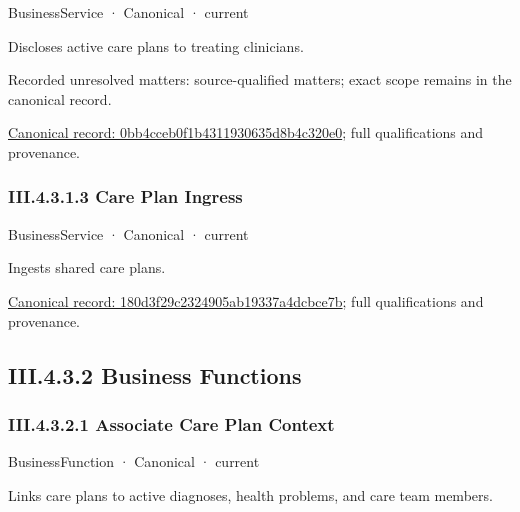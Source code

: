 \label{element:0bb4cceb0f1b4311930635d8b4c320e0}
{\small BusinessService · Canonical · current}\par

Discloses active care plans to treating clinicians.


{\small Recorded unresolved matters: source-qualified matters; exact scope remains in the canonical record.}\par
{\footnotesize \href{../../../../continuum/business/business-service/0bb4cceb0f1b4311930635d8b4c320e0.md}{Canonical record: 0bb4cceb0f1b4311930635d8b4c320e0}; full qualifications and provenance.}\par
\subsubsection*{III.4.3.1.3 Care Plan Ingress}
\label{navigation:III.4.3.1.3}

\label{element:180d3f29c2324905ab19337a4dcbce7b}
{\small BusinessService · Canonical · current}\par

Ingests shared care plans.


{\footnotesize \href{../../../../continuum/business/business-service/180d3f29c2324905ab19337a4dcbce7b.md}{Canonical record: 180d3f29c2324905ab19337a4dcbce7b}; full qualifications and provenance.}\par
\subsection*{III.4.3.2 Business Functions}
\label{navigation:III.4.3.2}

\subsubsection*{III.4.3.2.1 Associate Care Plan Context}
\label{navigation:III.4.3.2.1}

\label{element:98cd313fdaa74634a8e1ae56a5bb06dc}
{\small BusinessFunction · Canonical · current}\par

Links care plans to active diagnoses, health problems, and care team members.


